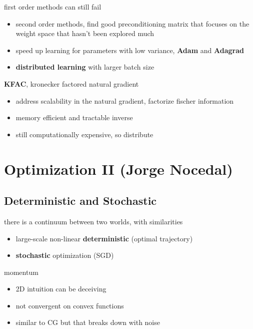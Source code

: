 \documentclass[]{article}
\theoremstyle{definition}
\begin{document}
    first order methods can still fail
    \begin{itemize}
        \item second order methods, find good preconditioning matrix that focuses on the weight space that hasn't been explored much
        \item speed up learning for parameters with low variance, \textbf{Adam} and \textbf{Adagrad}
        \item \textbf{distributed learning} with larger batch size
    \end{itemize}

    \textbf{KFAC}, kronecker factored natural gradient
    \begin{itemize}
        \item address scalability in the natural gradient, factorize fischer information
        \item memory efficient and tractable inverse
        \item still computationally expensive, so distribute
    \end{itemize}


    \section{Optimization II {\small(Jorge Nocedal)}}%
    \label{sec:optimization_ii}

    \subsection{Deterministic and Stochastic}%
    \label{sub:deterministic_and_stochastic}

    there is a continuum between two worlds, with similarities
    \begin{itemize}
        \item large-scale non-linear \textbf{deterministic} (optimal trajectory)
        \item \textbf{stochastic} optimization (SGD)
    \end{itemize}

    momentum
    \begin{itemize}
        \item 2D intuition can be deceiving
        \item not convergent on convex functions
        \item similar to CG but that breaks down with noise
    \end{itemize}
\end{document}
